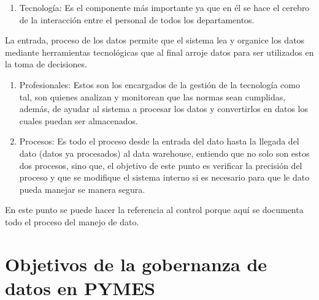 \documentclass[
  letterpaper,
  DIV=11,
  numbers=noendperiod]{scrreprt}
\providecommand{\tightlist}{%
  \setlength{\itemsep}{0pt}\setlength{\parskip}{0pt}}\usepackage{longtable,booktabs,array}
\begin{document}
\begin{enumerate}
\def\labelenumi{\arabic{enumi}.}
\tightlist
\item
  Tecnología: Es el componente más importante ya que en él se hace el
  cerebro de la interacción entre el personal de todos los
  departamentos.
\end{enumerate}

La entrada, proceso de los datos permite que el sistema lea y organice
los datos mediante herramientas tecnológicas que al final arroje datos
para ser utilizados en la toma de decisiones.

\begin{enumerate}
\def\labelenumi{\arabic{enumi}.}
\setcounter{enumi}{1}
\item
  Profesionales: Estos son los encargados de la gestión de la tecnología
  como tal, son quienes analizan y monitorean que las normas sean
  cumplidas, además, de ayudar al sistema a procesar los datos y
  convertirlos en datos los cuales puedan ser almacenados.
\item
  Procesos: Es todo el proceso desde la entrada del dato hasta la
  llegada del dato (datos ya procesados) al data warehouse, entiendo que
  no solo son estos dos procesos, sino que, el objetivo de este punto es
  verificar la precisión del proceso y que se modifique el sistema
  interno si es necesario para que le dato pueda manejar se manera
  segura.
\end{enumerate}

En este punto se puede hacer la referencia al control porque aquí se
documenta todo el proceso del manejo de dato.

\hypertarget{objetivos-de-la-gobernanza-de-datos-en-pymes}{%
\section{Objetivos de la gobernanza de datos en
PYMES}\label{objetivos-de-la-gobernanza-de-datos-en-pymes}}
\end{document}

